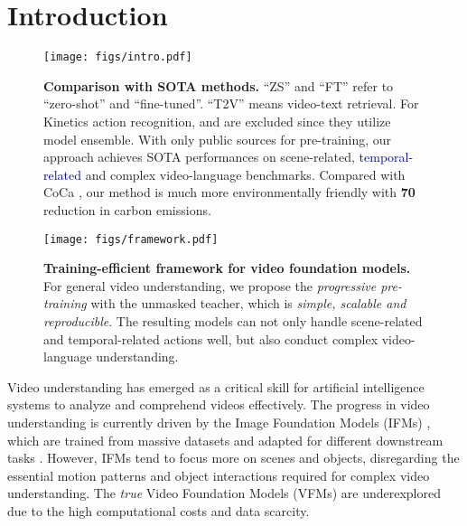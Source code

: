 \documentclass[10pt,twocolumn,letterpaper]{article}
\newcommand{\darkblue}[1]{\textcolor{darkblue}{#1}}
\begin{document}
\section{Introduction}

\begin{figure}[tp]
    \texttt{[image: figs/intro.pdf]}
    \vspace{-0.5cm}
    \caption{
    \textbf{Comparison with SOTA methods.}
    ``ZS'' and ``FT'' refer to ``zero-shot'' and ``fine-tuned''.
    ``T2V'' means video-text retrieval.
    For Kinetics action recognition,
    \cite{mtv} and \cite{Wang2022InternVideoGV} are excluded since they utilize model ensemble.
    With only public sources for pre-training,
    our approach achieves SOTA performances on scene-related, \darkblue{temporal-related} and complex video-language benchmarks.
    Compared with CoCa \cite{coca},
    our method is much more environmentally friendly with \textbf{70} reduction in carbon emissions.
    }
    \label{fig:intro}
    \vspace{-0.4cm}
\end{figure}


\begin{figure*}[thp]
    \centering
\texttt{[image: figs/framework.pdf]}
    \vspace{-0.3cm}
    \caption{
    \textbf{Training-efficient framework for video foundation models.} 
    For general video understanding,
    we propose the \textit{progressive pre-training} with the unmasked teacher, which is \textit{simple, scalable and reproducible}. 
    The resulting models can not only handle scene-related and temporal-related actions well,
    but also conduct complex video-language understanding.
    }
    \label{fig:framework}
    \vspace{-0.3cm}
\end{figure*}

Video understanding has emerged as a critical skill for artificial intelligence systems to analyze and comprehend videos effectively. 
The progress in video understanding is currently driven by the Image Foundation Models (IFMs) \cite{vit,mae,beit,clip,align}, 
which are trained from massive datasets and adapted for different downstream tasks \cite{imagenet,coca,ade,fickr}. 
However, 
IFMs tend to focus more on scenes and objects, 
disregarding the essential motion patterns and object interactions required for complex video understanding. 
The \textit{true} Video Foundation Models (VFMs) are underexplored due to the high computational costs and data scarcity.
\end{document}
